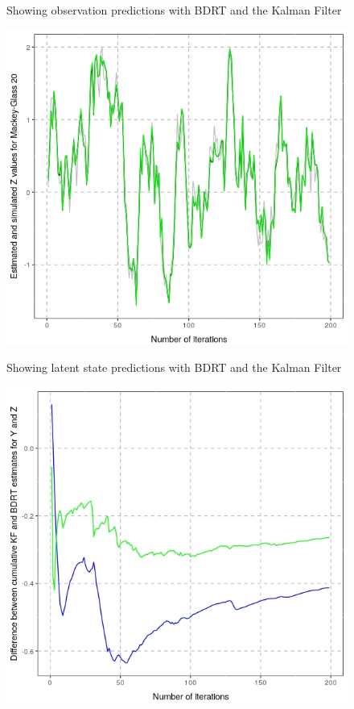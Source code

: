 \documentclass[a1paper,portrait, fontscale=0.45]{baposter}
\begin{document}
\begin{poster}
{\begin{multicols}{3}
\begin{figure}[H]
\begin{minipage}[c]{0.6\linewidth}
\vspace{-1.7em}
\caption{Showing observation predictions with BDRT and the Kalman Filter}
\end{minipage}
\end{figure}
\begin{figure}[H]
\hspace{1em}
\begin{minipage}[c]{0.6\linewidth}
\includegraphics[width=\linewidth]{statez.jpeg}
\label{fig:zpred}
\vspace{-1.7em}
\caption{Showing latent state predictions with BDRT and the Kalman Filter}
\end{minipage}
\end{figure}
\begin{figure}[H]
\hspace{1em}
\begin{minipage}[c]{0.6\linewidth}
\includegraphics[width=\linewidth]{kbdiff.jpeg}

\end{minipage}
\end{figure}
\end{multicols}}
\end{poster}
\end{document}
